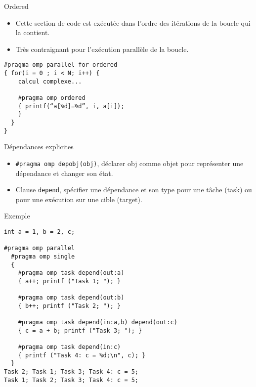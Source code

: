 \documentclass[10pt]{beamer}
\begin{document}
\begin{frame}[fragile]{Ordered}

  \begin{itemize}
    \item Cette section de code est exécutée dans l'ordre des itérations de la boucle qui la contient.

    \item Très contraignant pour l'exécution parallèle de la boucle.
  \end{itemize}
  \begin{verbatim}
#pragma omp parallel for ordered
{ for(i = 0 ; i < N; i++) { 
    calcul complexe...

    #pragma omp ordered
    { printf(“a[%d]=%d”, i, a[i]); 
    }
  }
}
  \end{verbatim}
\end{frame}

\begin{frame}[fragile]{Dépendances explicites}

  \begin{itemize}
    \item \verb|#pragma omp depobj(obj)|, déclarer obj comme objet pour représenter une dépendance et changer son état.

    \item Clause \texttt{depend}, spécifier une dépendance et son type pour une tâche (task) ou pour une exécution sur une cible (target).

  \end{itemize}
\end{frame}

\begin{frame}[fragile]{Exemple}

  \scriptsize
  \begin{verbatim}
int a = 1, b = 2, c;

#pragma omp parallel
  #pragma omp single
  {
    #pragma omp task depend(out:a)
    { a++; printf ("Task 1; "); }
    
    #pragma omp task depend(out:b)
    { b++; printf ("Task 2; "); }

    #pragma omp task depend(in:a,b) depend(out:c)
    { c = a + b; printf ("Task 3; "); }

    #pragma omp task depend(in:c)
    { printf ("Task 4: c = %d;\n", c); }
  }
Task 2; Task 1; Task 3; Task 4: c = 5;
Task 1; Task 2; Task 3; Task 4: c = 5;
  \end{verbatim}
\end{frame}
\end{document}
